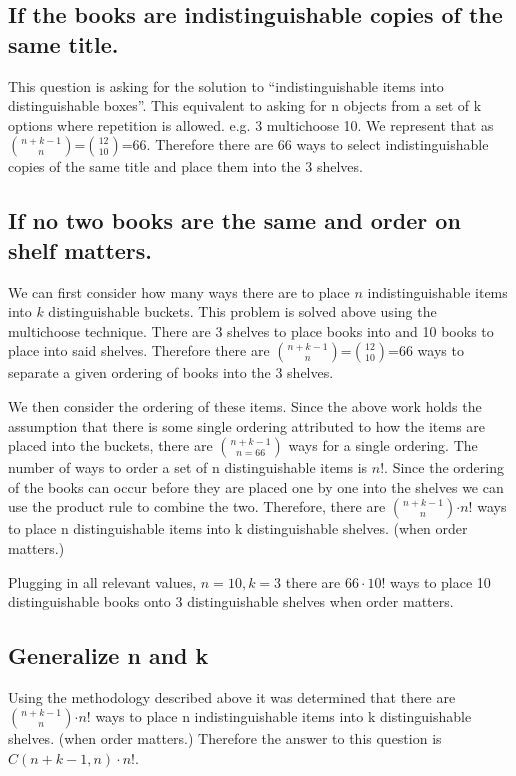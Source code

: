 \subsection{If the books are indistinguishable copies of the same title.}
This question is asking for the solution to ``indistinguishable items into distinguishable boxes''. This equivalent to asking for n objects from a set of k options where repetition is allowed. e.g. 3 multichoose 10. We represent that as ${n+k-1}\choose{n}$=${12}\choose{10}$=$66$. Therefore there are 66 ways to select indistinguishable copies of the same title and place them into the 3 shelves.

\subsection{If no two books are the same and order on shelf matters.}
We can first consider how many ways there are to place $n$ indistinguishable items into $k$ distinguishable buckets. This problem is solved above using the multichoose technique. There are 3 shelves to place books into and 10 books to place into said shelves. Therefore there are ${n+k-1}\choose{n}$=${12}\choose{10}$=$66$ ways to separate a given ordering of books into the 3 shelves.

We then consider the ordering of these items. Since the above work holds the assumption that there is some single ordering attributed to how the items are placed into the buckets, there are ${n+k-1}\choose{n}=66$ ways for a single ordering. The number of ways to order a set of n distinguishable items is $n!$. Since the ordering of the books can occur before they are placed one by one into the shelves we can use the product rule to combine the two. Therefore, there are ${n+k-1}\choose{n}$$\cdot n!$ ways to place n distinguishable items into k distinguishable shelves. (when order matters.)

Plugging in all relevant values, $n=10, k=3$ there are $66\cdot 10!$ ways to place 10 distinguishable books onto 3 distinguishable shelves when order matters.

\subsection{Generalize n and k}
Using the methodology described above it was determined that there are ${n+k-1}\choose{n}$$\cdot n!$ ways to place n indistinguishable items into k distinguishable shelves. (when order matters.) Therefore the answer to this question is $C(n+k-1,n)\cdot n!$.